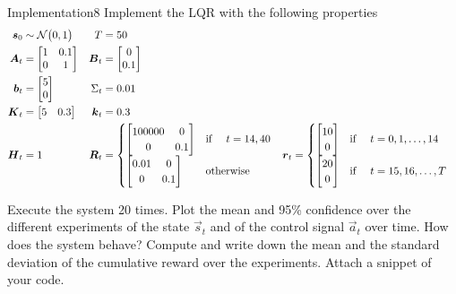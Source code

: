 \begin{questions}


\begin{question}{Implementation}{8}
	Implement the LQR with the following properties
	\begin{align*}
	{\boldsymbol{s}}_0 & \sim \mathcal{N}\big(0,1\big) &	T &= 50
	\\
	{\boldsymbol{A}}_t &= \begin{bmatrix}
       1 & 0.1\\
       0 & 1
    \end{bmatrix} &
	{\boldsymbol{B}}_t &= \begin{bmatrix}
       0 \\
       0.1
    \end{bmatrix}
    \\
	{\boldsymbol{b}}_t &= \begin{bmatrix}
       5\\
       0
    \end{bmatrix} & \Sigma_t &= 0.01
	\\
	{\boldsymbol{K}}_t &= \begin{bmatrix}
       5 &
       0.3
    \end{bmatrix} & 
	{\boldsymbol{k}}_t &= 0.3 & 
	\\
	{\boldsymbol{H}}_t &= 1 & 		
	{\boldsymbol{R}}_t &= \begin{cases}
	\begin{bmatrix}
	100000 &0\\
	0&0.1
	\end{bmatrix}  & \text{if \quad} t=14, 40
	\\
	\begin{bmatrix}
	0.01 &0\\
	0&0.1
	\end{bmatrix} & \text{otherwise}
	\end{cases}	
	&
	{\boldsymbol{r}}_t &= \begin{cases}
	\begin{bmatrix}
	10\\
	0
	\end{bmatrix}  & \text{if \quad} t=0,1,\ldots,14
	\\
	\begin{bmatrix}
	20\\
	0
	\end{bmatrix}  & \text{if \quad} t=15,16,\ldots,T
	\end{cases}	
	\end{align*}
	
	Execute the system 20 times.
	Plot the mean and 95\% confidence over the different experiments of the state $\vec s_t$ and of the control signal $\vec a_t$ over time. 
	How does the system behave? 
	Compute and write down the mean and the standard deviation of the cumulative reward over the experiments. 
	Attach a snippet of your code.
	

\end{question}
\end{questions}
